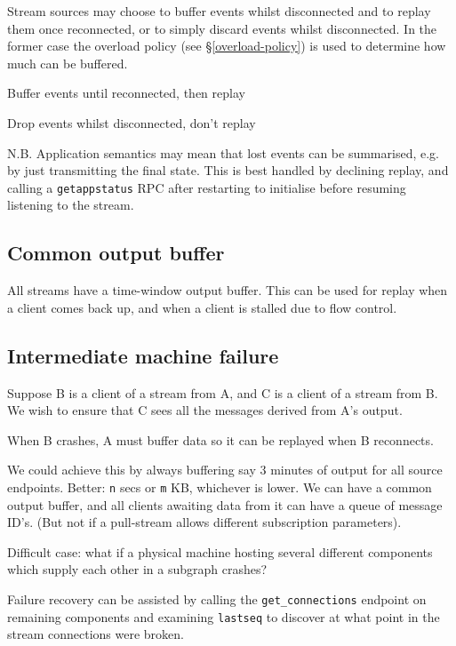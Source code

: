 \documentclass[12pt,a4paper,twoside]{article}
\renewcommand{\_}{\texttt{\symbol{95}}}
\begin{document}
Stream sources may choose to buffer events whilst disconnected and
to replay them once reconnected, or to simply discard events
whilst disconnected. In the former case the overload policy (see
\S \ref{overload-policy}) is used to determine how much can be
buffered.

\begin{bulletlist}
\item Buffer events until reconnected, then replay
\item Drop events whilst disconnected, don't replay
\end{bulletlist}

N.B. Application semantics may mean that lost events can be summarised,
e.g. by just transmitting the final state. This is best handled by
declining replay, and calling a \texttt{get\_app\_status}
RPC after restarting
to initialise before resuming listening to the stream.

\subsection{Common output buffer}

All streams have a time-window output buffer. This can be used for replay
when a client comes back up, and when a client is stalled due to flow
control.

\subsection{Intermediate machine failure}

Suppose B is a client of a stream from A, and C is a client of a
stream from B. We wish to ensure that C sees all the messages
derived from A's output.

When B crashes, A must buffer data so it can be replayed when
B reconnects.

We could achieve this by always buffering say 3 minutes of output
for all source endpoints. Better: \verb^n^ secs or \verb^m^ KB, whichever
is lower.
We can have a common output buffer, and all clients awaiting data
from it can have a queue of message ID's. (But not if a pull-stream
allows different subscription parameters).

Difficult case: what if a physical machine hosting several different
components which supply each other in a subgraph crashes?

Failure recovery can be assisted by calling the \verb^get_connections^
endpoint on remaining components and examining \verb^lastseq^
to discover at what point in the stream connections were broken.
\end{document}
